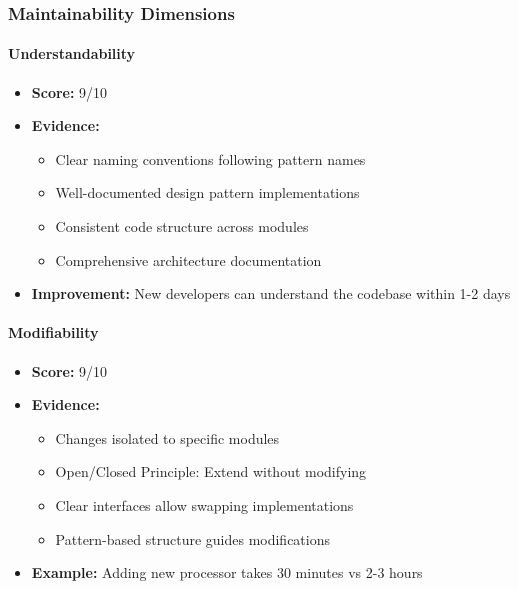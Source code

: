 \documentclass[11pt, a4paper]{article}
\theoremstyle{plain}
\theoremstyle{definition}
\begin{document}
\subsubsection{Maintainability Dimensions}

\paragraph{Understandability}
\begin{itemize}
    \item \textbf{Score:} 9/10
    \item \textbf{Evidence:}
    \begin{itemize}
        \item Clear naming conventions following pattern names
        \item Well-documented design pattern implementations
        \item Consistent code structure across modules
        \item Comprehensive architecture documentation
    \end{itemize}
    \item \textbf{Improvement:} New developers can understand the codebase within 1-2 days
\end{itemize}

\paragraph{Modifiability}
\begin{itemize}
    \item \textbf{Score:} 9/10
    \item \textbf{Evidence:}
    \begin{itemize}
        \item Changes isolated to specific modules
        \item Open/Closed Principle: Extend without modifying
        \item Clear interfaces allow swapping implementations
        \item Pattern-based structure guides modifications
    \end{itemize}
    \item \textbf{Example:} Adding new processor takes 30 minutes vs 2-3 hours
\end{itemize}
\end{document}
